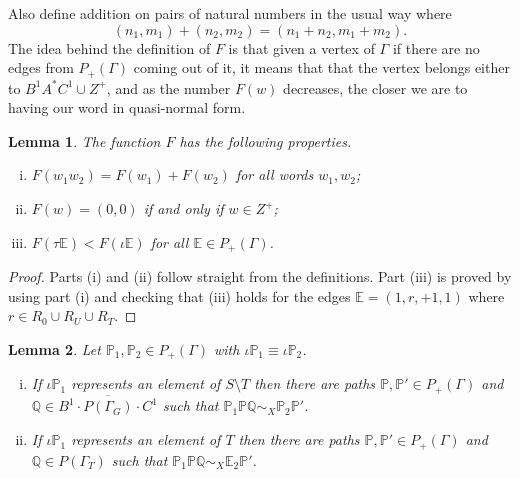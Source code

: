 \documentclass[11pt]{amsart}
\newtheorem{lem}{Lemma}
\theoremstyle{plain}
\begin{document}
Also define addition on pairs of natural numbers in the usual way where
\[
(n_1,m_1) + (n_2,m_2) = (n_1+n_2, m_1 + m_2).
\]
The idea behind the definition of $F$ is that given a vertex of $\Gamma$ if there are no edges from $P_+(\Gamma)$ coming out of it, it means that that the vertex belongs either to $B^1 A^* C^1 \cup Z^+$, and as the number $F(w)$ decreases, the closer we are to having our word in quasi-normal form.
\begin{lem}\label{FProp}
The function $F$ has the following properties.
\begin{enumerate}[(i)]
\item $F(w_1w_2) = F(w_1) + F(w_2)$ for all words $w_1, w_2$;
\item $F(w) = (0,0)$ if and only if $w \in Z^+$;
\item  $F(\tau {\mathbb{E}}) < F(\iota {\mathbb{E}})$ for all ${\mathbb{E}} \in P_+(\Gamma)$.
\end{enumerate}
\end{lem}
\begin{proof}
Parts (i) and (ii) follow straight from the definitions. Part (iii) is proved by using part (i) and checking that (iii) holds for the edges ${\mathbb{E}} = (1,r,+1,1)$ where $r \in R_0 \cup R_U \cup R_T$. 
\end{proof}
\begin{lem}\label{Lemma5}
Let ${\mathbb{P}}_1, {\mathbb{P}}_2 \in P_+(\Gamma)$ with $\iota {\mathbb{P}}_1 \equiv \iota {\mathbb{P}}_2$.
\begin{enumerate}[(i)] 
\item If $\iota {\mathbb{P}}_1$ represents an element of $S \setminus T$ then there are paths ${\mathbb{P}},{\mathbb{P}}' \in P_+(\Gamma)$ and ${\mathbb{Q}} \in \overline{B^1 \cdot P(\Gamma_G) \cdot C^1}$ such that ${\mathbb{P}}_1 {\mathbb{P}} {\mathbb{Q}} \sim_X {\mathbb{P}}_2 {\mathbb{P}}'$.
\item If $\iota {\mathbb{P}}_1$ represents an element of $T$ then there are paths ${\mathbb{P}},{\mathbb{P}}' \in P_+(\Gamma)$ and ${\mathbb{Q}} \in P(\Gamma_T)$ such that ${\mathbb{P}}_1 {\mathbb{P}} {\mathbb{Q}} \sim_X {\mathbb{E}}_2 {\mathbb{P}}'$.
\end{enumerate}
\end{lem}
\end{document}
